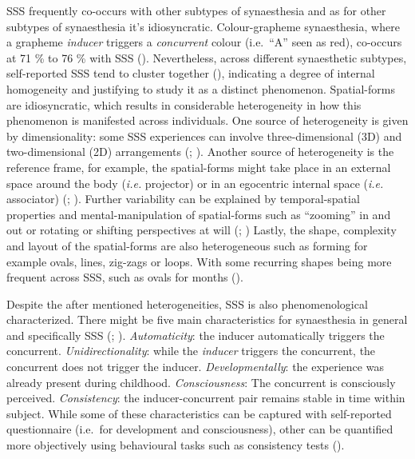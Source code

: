 \documentclass[
  man,
  longtable,
  a4paper,
  nolmodern,
  notxfonts,
  notimes,
  colorlinks=true,linkcolor=blue,citecolor=blue,urlcolor=blue]{apa7}
\begin{document}
SSS frequently co-occurs with other subtypes of synaesthesia and as for
other subtypes of synaesthesia it's idiosyncratic. Colour-grapheme
synaesthesia, where a grapheme \emph{inducer} triggers a
\emph{concurrent} colour (i.e.~``A'' seen as red), co-occurs at 71 \% to
76 \% with SSS ().
Nevertheless, across different synaesthetic subtypes, self-reported SSS
tend to cluster together (), indicating a degree of internal homogeneity and justifying to
study it as a distinct phenomenon. Spatial-forms are idiosyncratic,
which results in considerable heterogeneity in how this phenomenon is
manifested across individuals. One source of heterogeneity is given by
dimensionality: some SSS experiences can involve three-dimensional (3D)
and two-dimensional (2D) arrangements
(;
). Another source of
heterogeneity is the reference frame, for example, the spatial-forms
might take place in an external space around the body (\emph{i.e.}
projector) or in an egocentric internal space (\emph{i.e.} associator)
(;
). Further variability can
be explained by temporal-spatial properties and mental-manipulation of
spatial-forms such as ``zooming'' in and out or rotating or shifting
perspectives at will (;
) Lastly, the shape,
complexity and layout of the spatial-forms are also heterogeneous such
as forming for example ovals, lines, zig-zags or loops. With some
recurring shapes being more frequent across SSS, such as ovals for
months ().

Despite the after mentioned heterogeneities, SSS is also
phenomenological characterized. There might be five main characteristics
for synaesthesia in general and specifically SSS
(;
). \emph{Automaticity}: the
inducer automatically triggers the concurrent. \emph{Unidirectionality}:
while the \emph{inducer} triggers the concurrent, the concurrent does
not trigger the inducer. \emph{Developmentally}: the experience was
already present during childhood. \emph{Consciousness}: The concurrent
is consciously perceived. \emph{Consistency}: the inducer-concurrent
pair remains stable in time within subject. While some of these
characteristics can be captured with self-reported questionnaire
(i.e.~for development and consciousness), other can be quantified more
objectively using behavioural tasks such as consistency tests
().
\end{document}
